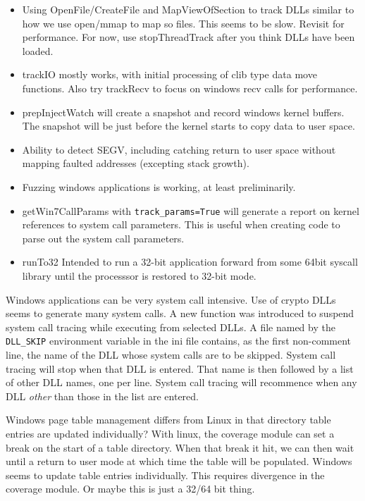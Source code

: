 \documentclass[titlepage]{article}
\begin{document}
\begin{appendices}
\begin{itemize}
\item Using OpenFile/CreateFile and MapViewOfSection to track DLLs similar to how we use open/mmap to map so files.  This seems to be slow.
Revisit for performance.  For now, use stopThreadTrack after you think DLLs have been loaded.

\item trackIO mostly works, with initial processing of clib type data move functions.  Also try trackRecv to focus on windows recv calls for performance.  

\item prepInjectWatch will create a snapshot and record windows kernel buffers.  The snapshot will be just before the kernel starts to copy data to user space.

\item Ability to detect SEGV, including catching return to user space without mapping faulted addresses (excepting stack growth).

\item Fuzzing windows applications is working, at least preliminarily.

\item getWin7CallParams with {\tt track\_params=True} will generate a report on kernel references to system call parameters.  This is useful when creating code to parse out
the system call parameters.

\item runTo32 Intended to run a 32-bit application forward from some 64bit syscall library until the processsor is restored to 32-bit mode.
\end{itemize}
\label{dll_skip}
Windows applications can be very system call intensive.  Use of crypto DLLs seems to generate many system calls.  A new function was introduced to suspend 
system call tracing while executing from selected DLLs. A file named by the {\tt DLL\_SKIP} environment variable in the ini file contains, as the first non-comment line, the name of the DLL whose system calls are to be 
skipped. System call tracing will stop when that DLL is entered.  That name is then followed by a list of other DLL names, one per line.  
System call tracing will recommence when any DLL \textit{other} than those in the list are entered.

Windows page table management differs from Linux in that directory table entries are updated individually? With linux, the coverage module can
set a break on the start of a table directory.  When that break it hit, we can then wait until a return to user mode at which time the
table will be populated.  Windows seems to update table entries individually.  This requires divergence in the coverage module.  Or maybe this is just a 32/64 bit thing.


\end{appendices}
\end{document}
